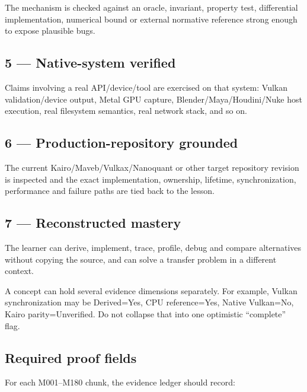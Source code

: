 The mechanism is checked against an oracle, invariant, property test, differential implementation, numerical bound or external normative reference strong enough to expose plausible bugs.

\subsection{5 --- Native-system verified}\label{appendix-2a2e5bd7143a-native-system-verified}

Claims involving a real API/device/tool are exercised on that system: Vulkan validation/device output, Metal GPU capture, Blender/Maya/Houdini/Nuke host execution, real filesystem semantics, real network stack, and so on.

\subsection{6 --- Production-repository grounded}\label{appendix-2a2e5bd7143a-production-repository-grounded}

The current Kairo/Maveb/Vulkax/Nanoquant or other target repository revision is inspected and the exact implementation, ownership, lifetime, synchronization, performance and failure paths are tied back to the lesson.

\subsection{7 --- Reconstructed mastery}\label{appendix-2a2e5bd7143a-reconstructed-mastery}

The learner can derive, implement, trace, profile, debug and compare alternatives without copying the source, and can solve a transfer problem in a different context.

A concept can hold several evidence dimensions separately. For example, Vulkan synchronization may be Derived=Yes, CPU reference=Yes, Native Vulkan=No, Kairo parity=Unverified. Do not collapse that into one optimistic ``complete'' flag.

\subsection{Required proof fields}\label{appendix-2a2e5bd7143a-required-proof-fields}

For each M001--M180 chunk, the evidence ledger should record:

